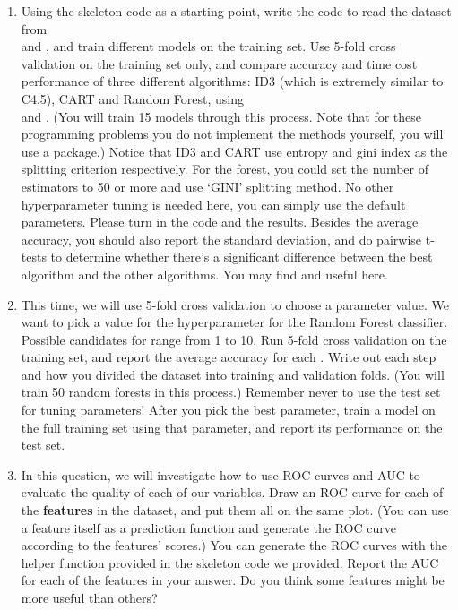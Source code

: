 \documentclass[11pt]{article}
\begin{document}
\begin{enumerate}[label=(\alph*)]
    \item Using the skeleton code as a starting point, write the code to read the dataset from\\  and , and train different models on the training set. Use 5-fold cross validation on the training set only, and compare accuracy and time cost performance of three different  algorithms:  ID3 (which is extremely similar to C4.5), CART and Random Forest, using \\  and
    . (You will train 15 models through this process. Note that for these programming problems you do not implement the methods yourself, you will use a package.)
    Notice that ID3 and CART use entropy and gini index as the splitting criterion respectively. For the forest, you could set the number of estimators to 50 or more and use `GINI' splitting method. No other hyperparameter tuning is needed here, you can simply use the default parameters. Please turn in the code and the results. Besides the average accuracy, you should also report the standard deviation, and do pairwise t-tests to determine whether there's a significant difference between the best algorithm and the other algorithms. You may find  and  useful here. 
    
    \item This time, we will use 5-fold cross validation to choose a parameter value. We want to pick a value for the hyperparameter  for the Random Forest classifier. Possible candidates for  range from 1 to 10. Run 5-fold cross validation on the training set, and report the average accuracy for each . Write out each step and how you divided the dataset into training and validation folds. (You will train 50 random forests in this process.)
    Remember never to use the test set for tuning parameters! After you pick the best parameter, train a model on the full training set using that parameter, and report its performance on the test set.
    
    
    \item In this question, we will investigate how to use ROC curves and AUC to evaluate the quality of each of our variables. Draw an ROC curve for each of the \textbf{features} in the dataset, and put them all on the same plot. (You can use a feature itself as a prediction function and generate the ROC curve according to the features' scores.) You can generate the ROC curves with the helper function provided in the skeleton code we provided. Report the AUC for each of the features in your answer. Do you think some features might be more useful than others? 
    

\end{enumerate}
\end{document}
